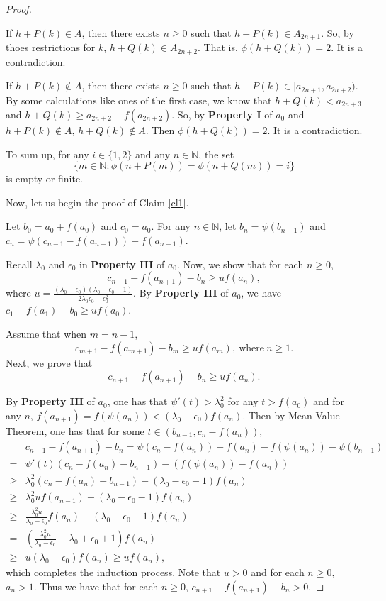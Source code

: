 \documentclass[reqno,12pt]{amsart}
\def \N {\mathbb N}
\numberwithin{equation}{section}
\begin{document}
\begin{proof}
\begin{itemize}
		If $h+P(k)\in A$, then there exists $n\ge 0$ such that $h+P(k)\in A_{2n+1}$. So, by thoes restrictions for $k$, $h+Q(k)\in A_{2n+2}$. That is, $\phi(h+Q(k))=2$. It is a contradiction.
		
		If $h+P(k)\notin A$, then there exists $n\ge 0$ such that $h+P(k)\in [a_{2n+1},a_{2n+2})$. By some calculations like ones of the first case, we know that $h+Q(k)<a_{2n+3}$ and $h+Q(k)\ge a_{2n+2}+f(a_{2n+2})$. So, by \textbf{Property I} of $a_0$ and $h+P(k)\notin A$,  $h+Q(k)\notin A$. Then $\phi(h+Q(k))=2$. It is a contradiction.
	\end{itemize}
	
	To sum up, for any $i\in \{1,2\}$ and any $n\in \N$, the set $$\{m\in \N:\phi(n+P(m))=\phi(n+Q(m))=i\}$$ is empty or finite.
	
	Now, let us begin the proof of Claim \ref{cl1}.
		
		
		Let $b_0=a_0+f(a_0)$ and $c_0=a_0$. For any $n\in\N$, let
$b_n=\psi(b_{n-1})$ and
$c_n=\psi(c_{n-1}-f(a_{n-1}) )+f(a_{n-1})$.

Recall $\lambda_0$ and $\epsilon_0$ in \textbf{Property III} of $a_0$. Now, we show that for each $n\ge 0$, $$c_{n+1}-f(a_{n+1})-b_n \geq uf(a_n),$$
where $u=\frac{(\lambda_0-\epsilon_0)(\lambda_0-\epsilon_0-1)}{2\lambda_0\epsilon_0-\epsilon_0^2}$.
By \textbf{Property III} of $a_0$, we have $c_{1}-f(a_{1})-b_0 \geq uf(a_0)$.

Assume that when $m=n-1$, $$c_{m+1}-f(a_{m+1})-b_m \geq uf(a_m),\ \text{where}\ n\ge 1.$$ Next, we prove that $$c_{n+1}-f(a_{n+1})-b_n \geq uf(a_n).$$

By \textbf{Property III} of $a_0$, one has that $\psi'(t)>\lambda_0^2$ for any $t>f(a_0)$ and for any $n$, $f(a_{n+1})=f(\psi(a_n))<(\lambda_0-\epsilon_0)f(a_n)$. Then by Mean Value Theorem, one has that for some $t\in (b_{n-1},c_n-f(a_n))$,
\begin{align*}
& c_{n+1}-f(a_{n+1})-b_n=\psi(c_{n}-f(a_n))+f(a_n)-f(\psi(a_n))-\psi(b_{n-1})
\\ = &
\psi'(t)(c_n-f(a_n)-b_{n-1})-(f(\psi(a_n))-f(a_n))
\\ \ge &
\lambda_0^2(c_n-f(a_n)-b_{n-1})-(\lambda_0-\epsilon_0-1)f(a_n)
\\ \ge &
\lambda_0^2 uf(a_{n-1})-(\lambda_0-\epsilon_0-1)f(a_n)
\\ \ge &
\frac{\lambda_0^2u}{\lambda_0-\epsilon_0}f(a_n)-(\lambda_0-\epsilon_0-1)f(a_n)
\\ = &
(\frac{\lambda_0^2u}{\lambda_0-\epsilon_0}-\lambda_0+\epsilon_0+1)f(a_n)
\\ \ge &
u(\lambda_0-\epsilon_0)f(a_n)\geq uf(a_{n}),
\end{align*}
which completes the induction process. Note that $u>0$ and for each $n\ge 0$, $a_n>1$. Thus we have that for each $n\ge 0$, $ c_{n+1}-f(a_{n+1})-b_n>0$.


\end{proof}
\end{document}
